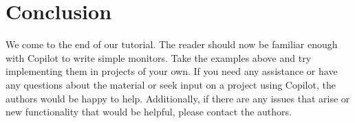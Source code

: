 \section{Conclusion}
\label{sec:conclusion}
	We come to the end of our tutorial. The reader should now be familiar enough with Copilot to write simple monitors.
  Take the examples above and try
implementing them in projects of your own. If you need any assistance or have
any questions about the material  or seek input on a project using Copilot, 
the authors would be happy to help. Additionally, if there are any issues that arise or
new functionality that would be helpful, please contact the authors.
\newpage
